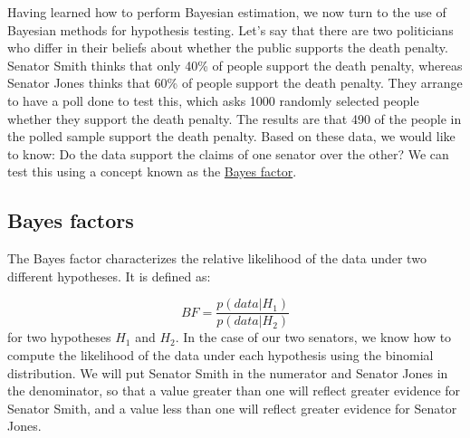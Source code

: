 \documentclass[]{book}
\newenvironment{Shaded}{\begin{snugshade}}{\end{snugshade}}
\newcommand{\KeywordTok}[1]{\textcolor[rgb]{0.13,0.29,0.53}{\textbf{#1}}}
\newcommand{\DataTypeTok}[1]{\textcolor[rgb]{0.13,0.29,0.53}{#1}}
\newcommand{\DecValTok}[1]{\textcolor[rgb]{0.00,0.00,0.81}{#1}}
\newcommand{\FloatTok}[1]{\textcolor[rgb]{0.00,0.00,0.81}{#1}}
\newcommand{\StringTok}[1]{\textcolor[rgb]{0.31,0.60,0.02}{#1}}
\newcommand{\CommentTok}[1]{\textcolor[rgb]{0.56,0.35,0.01}{\textit{#1}}}
\newcommand{\OperatorTok}[1]{\textcolor[rgb]{0.81,0.36,0.00}{\textbf{#1}}}
\newcommand{\NormalTok}[1]{#1}
\theoremstyle{definition}
\theoremstyle{definition}
\theoremstyle{definition}
\theoremstyle{remark}
\begin{document}
Having learned how to perform Bayesian estimation, we now turn to the
use of Bayesian methods for hypothesis testing. Let's say that there are
two politicians who differ in their beliefs about whether the public
supports the death penalty. Senator Smith thinks that only 40\% of
people support the death penalty, whereas Senator Jones thinks that 60\%
of people support the death penalty. They arrange to have a poll done to
test this, which asks 1000 randomly selected people whether they support
the death penalty. The results are that 490 of the people in the polled
sample support the death penalty. Based on these data, we would like to
know: Do the data support the claims of one senator over the other? We
can test this using a concept known as the
\href{https://bayesfactor.blogspot.com/2014/02/the-bayesfactor-package-this-blog-is.html}{Bayes
factor}.

\subsection{Bayes factors}\label{bayes-factors}

The Bayes factor characterizes the relative likelihood of the data under
two different hypotheses. It is defined as:

\[
BF = \frac{p(data|H_1)}{p(data|H_2)}
\] for two hypotheses \(H_1\) and \(H_2\). In the case of our two
senators, we know how to compute the likelihood of the data under each
hypothesis using the binomial distribution. We will put Senator Smith in
the numerator and Senator Jones in the denominator, so that a value
greater than one will reflect greater evidence for Senator Smith, and a
value less than one will reflect greater evidence for Senator Jones.

\begin{Shaded}
\end{Shaded}
\end{document}
